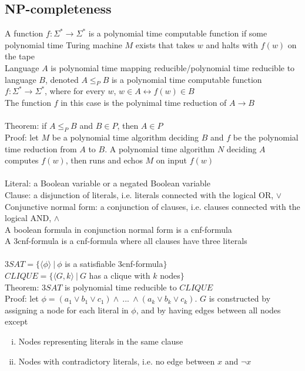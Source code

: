 \documentclass{article}
\newcommand*{\<}{\langle}
\renewcommand*{\>}{\rangle}
\begin{document}
		\subsection{NP-completeness}
			A function $f: \Sigma^* \to \Sigma^*$ is a polynomial time computable function if some polynomial time Turing machine $M$ exists that takes $w$ and halts with $f(w)$ on the tape \\
			Language $A$ is polynomial time mapping reducible/polynomial time reducible to language $B$, denoted $A \leq_P B$ is a polynomial time computable function $f: \Sigma^* \to \Sigma^*$, where for every $w$, $w \in A \leftrightarrow f(w) \in B$ \\
			The function $f$ in this case is the polynimal time reduction of $A \to B$ \\
			\\
			Theorem: if $A \leq_P B$ and $B \in P$, then $A \in P$ \\
			Proof: let $M$ be a polynomial time algorithm deciding $B$ and $f$ be the polynomial time reduction from $A$ to $B$. A polynomial time algorithm $N$ deciding $A$ computes $f(w)$, then runs and echos $M$ on input $f(w)$ \\
			\\
			Literal: a Boolean variable or a negated Boolean variable \\
			Clause: a disjunction of literals, i.e. literals connected with the logical OR, $\lor$ \\
			Conjunctive normal form: a conjunction of clauses, i.e. clauses connected with the logical AND, $\land$ \\
			A boolean formula in conjunction normal form is a cnf-formula \\
			A 3cnf-formula is a cnf-formula where all clauses have three literals \\
			\\
			$3SAT = \{\<\phi\>\:|\:\phi$ is a satisfiable 3cnf-formula$\}$ \\
			$CLIQUE = \{\<G, k\>\:|\:G$ has a clique with $k$ nodes$\}$ \\
			Theorem: $3SAT$ is polynomial time reducible to $CLIQUE$ \\
			Proof: let $\phi = (a_1 \lor b_1 \lor c_1) \land\:...\:\land (a_k \lor b_k \lor c_k)$. $G$ is constructed by assigning a node for each literal in $\phi$, and by having edges between all nodes except
			\begin{enumerate}[(i)]
				\item Nodes representing literals in the same clause
				\item Nodes with contradictory literals, i.e. no edge between $x$ and $\neg x$
				\end{enumerate}
\end{document}
